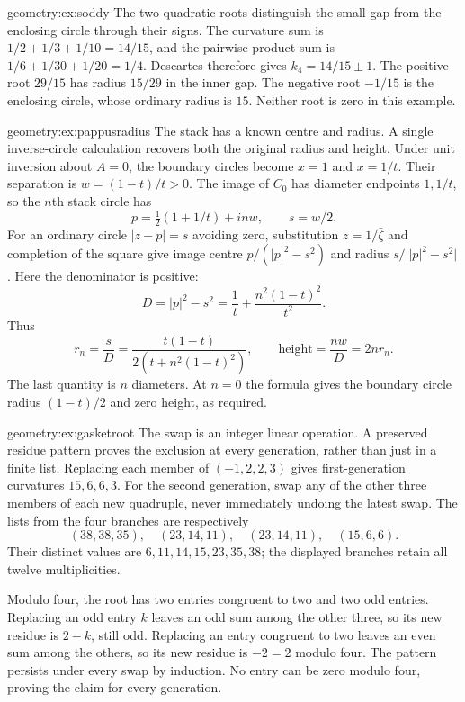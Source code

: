\begin{solution}{geometry:ex:soddy}
\idea The two quadratic roots distinguish the small gap from the enclosing circle through their signs.
\writeup The curvature sum is $1/2+1/3+1/10=14/15$, and the pairwise-product sum is $1/6+1/30+1/20=1/4$. Descartes therefore gives $k_4=14/15\pm1$. The positive root $29/15$ has radius $15/29$ in the inner gap. The negative root $-1/15$ is the enclosing circle, whose ordinary radius is $15$. Neither root is zero in this example.
\end{solution}

\begin{solution}{geometry:ex:pappusradius}
\idea The stack has a known centre and radius. A single inverse-circle calculation recovers both the original radius and height.
\writeup Under unit inversion about $A=0$, the boundary circles become $x=1$ and $x=1/t$. Their separation is $w=(1-t)/t>0$. The image of $C_0$ has diameter endpoints $1,1/t$, so the $n$th stack circle has
\[
p=\tfrac12(1+1/t)+inw,\qquad s=w/2.
\]
For an ordinary circle $|z-p|=s$ avoiding zero, substitution $z=1/\bar\zeta$ and completion of the square give image centre $p/(|p|^2-s^2)$ and radius $s/\bigl||p|^2-s^2\bigr|$. Here the denominator is positive:
\[
D=|p|^2-s^2=\frac1t+\frac{n^2(1-t)^2}{t^2}.
\]
Thus
\[
r_n=\frac{s}{D}
=\frac{t(1-t)}{2(t+n^2(1-t)^2)},\qquad
\text{height}=\frac{nw}{D}=2nr_n.
\]
The last quantity is $n$ diameters. At $n=0$ the formula gives the boundary circle radius $(1-t)/2$ and zero height, as required.
\end{solution}

\begin{solution}{geometry:ex:gasketroot}
\idea The swap is an integer linear operation. A preserved residue pattern proves the exclusion at every generation, rather than just in a finite list.
\writeup Replacing each member of $(-1,2,2,3)$ gives first-generation curvatures $15,6,6,3$. For the second generation, swap any of the other three members of each new quadruple, never immediately undoing the latest swap. The lists from the four branches are respectively
\[
(38,38,35),\quad(23,14,11),\quad(23,14,11),\quad(15,6,6).
\]
Their distinct values are $6,11,14,15,23,35,38$; the displayed branches retain all twelve multiplicities.

Modulo four, the root has two entries congruent to two and two odd entries. Replacing an odd entry $k$ leaves an odd sum among the other three, so its new residue is $2-k$, still odd. Replacing an entry congruent to two leaves an even sum among the others, so its new residue is $-2=2$ modulo four. The pattern persists under every swap by induction. No entry can be zero modulo four, proving the claim for every generation.
\end{solution}

